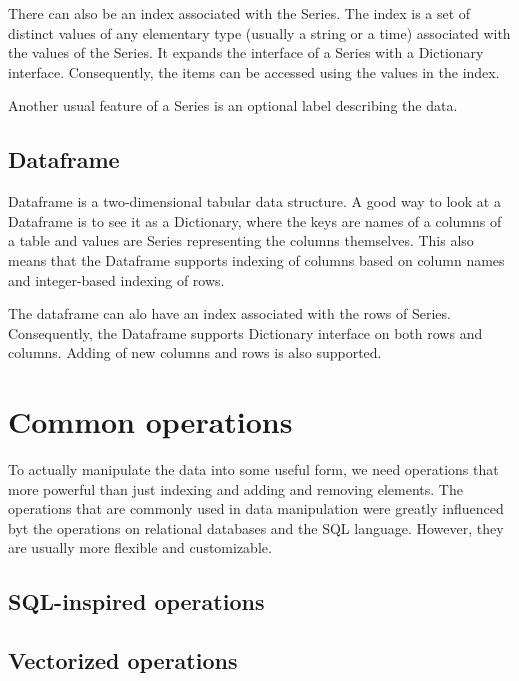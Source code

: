 There can also be an index associated with the Series.
The index is a set of distinct values of any elementary type (usually a string or a time) associated with the values of
the Series.
It expands the interface of a Series with a Dictionary interface.
Consequently, the items can be accessed using the values in the index. 

Another usual feature of a Series is an optional label describing the data. 



\subsection{Dataframe}

Dataframe is a two-dimensional tabular data structure.
A good way to look at a Dataframe is to see it as a Dictionary, where the keys are names of a columns of a table
and values are Series representing the columns themselves.
This also means that the Dataframe supports indexing of columns based on column names and integer-based indexing of rows.

The dataframe can alo have an index associated with the rows of Series.
Consequently, the Dataframe supports Dictionary interface on both rows and columns.
Adding of new columns and rows is also supported.


\section{Common operations} %

To actually manipulate the data into some useful form, we need operations that more powerful than just indexing and
adding and removing elements.
The operations that are commonly used in data manipulation were greatly influenced byt the operations on relational
databases and the SQL language.
However, they are usually more flexible and customizable. %

\subsection{SQL-inspired operations}


\subsection{Vectorized operations}


